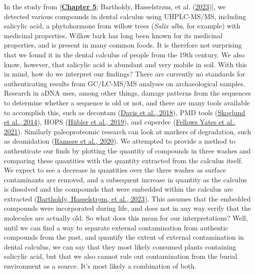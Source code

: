\documentclass[
  letterpaper,
]{book}
\begin{document}
In the study from
{[}\protect\hyperlink{mb11CalculusPilot}{\textbf{Chapter 5}}; Bartholdy,
Hasselstrøm, et al.
(\protect\hyperlink{ref-bartholdyMultiproxyAnalysis2023}{2023}){]}, we
detected various compounds in dental calculus using UHPLC-MS/MS,
including salicylic acid, a phytohormone from willow trees (\emph{Salix
alba}, for example) with medicinal properties. Willow bark has long been
known for its medicinal properties, and is present in many common foods.
It is therefore not surprising that we found it in the dental calculus
of people from the 19th century. We also know, however, that salicylic
acid is abundant and very mobile in soil. With this in mind, how do we
interpret our findings? There are currently no standards for
authenticating results from GC/LC-MS/MS analyses on archaeological
samples. Research in aDNA uses, among other things, damage patterns from
the sequences to determine whether a sequence is old or not, and there
are many tools available to accomplish this, such as decontam
(\protect\hyperlink{ref-Rdecontam}{Davis et al., 2018}), PMD tools
(\protect\hyperlink{ref-skoglundSeparatingEndogenous2014}{Skoglund et
al., 2014}), HOPS
(\protect\hyperlink{ref-hublerHOPSAutomated2019}{Hübler et al., 2019}),
and cuperdec (\protect\hyperlink{ref-yatesOralMicrobiome2021}{Fellows
Yates et al., 2021}). Similarly paleoproteomic research can look at
markers of degradation, such as deamidation
(\protect\hyperlink{ref-ramsoeDeamiDATESitespecific2020}{Ramsøe et al.,
2020}). We attempted to provide a method to authenticate our finds by
plotting the quantity of compounds in three washes and comparing these
quantities with the quantity extracted from the calculus itself. We
expect to see a decrease in quantities over the three washes as surface
contaminants are removed, and a subsequent increase in quantity as the
calculus is dissolved and the compounds that were embedded within the
calculus are extracted
(\protect\hyperlink{ref-bartholdyMultiproxyAnalysis2023}{Bartholdy,
Hasselstrøm, et al., 2023}). This assumes that the embedded compounds
were incorporated during life, and does not in any way verify that the
molecules are actually old. So what does this mean for our
interpretations? Well, until we can find a way to separate external
contamination from authentic compounds from the past, and quantify the
extent of external contamination in dental calculus, we can say that
they most likely consumed plants containing salicylic acid, but that we
also cannot rule out contamination from the burial environment as a
source. It's most likely a combination of both.
\end{document}
